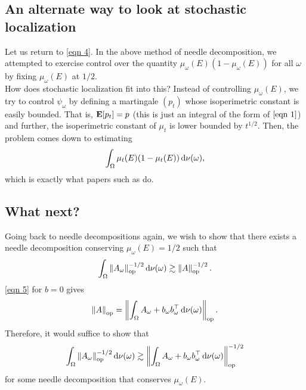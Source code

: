 \documentclass{article}
\begin{document}
	\subsection{An alternate way to look at stochastic localization}

		Let us return to \eqref{eqn 4}. In the above method of needle decomposition, we attempted to exercise control over the quantity $\mu_\omega(E) ( 1 - \mu_\omega(E) )$ for all $\omega$ by fixing $\mu_\omega(E)$ at $1/2$.\\

		How does stochastic localization fit into this? Instead of controlling $\mu_\omega(E)$, we try to control $\psi_\omega$ by defining a martingale $(p_t)$ whose isoperimetric constant is easily bounded. That is, $\textbf{E}[p_t] = p$ (this is just an integral of the form of $\eqref{eqn 1}$) and further, the isoperimetric constant of $\mu_t$ is lower bounded by $t^{1/2}$. Then, the problem comes down to estimating
		\[ \int_\Omega \mu_t(E) ( 1 - \mu_t(E) ) \operatorname{d}\!{\nu(\omega)}, \]
		which is exactly what papers such as \cite{chen2021constant} do.

	\subsection{What next?}

		Going back to needle decompositions again, we wish to show that there exists a needle decomposition conserving $\mu_\omega(E) = 1/2$ such that
		\[ \int_{\Omega} \left\lVert A_\omega\right\rVert_{\text{op}}^{-1/2} \operatorname{d}\!{\nu(\omega)} \gtrsim \left\lVert A\right\rVert_{\text{op}}^{-1/2}. \]
		\eqref{eqn 5} for $b = 0$ gives
		\[ \left\lVert A\right\rVert_{\text{op}} = \left\lVert\int_{\Omega} A_\omega + b_\omega b_\omega^\top \operatorname{d}\!{\nu(\omega)} \right\rVert_{\text{op}}. \]
		Therefore, it would suffice to show that
		\[ \int_\Omega \left\lVert A_\omega\right\rVert_{\text{op}}^{-1/2} \operatorname{d}\!{\nu(\omega)} \gtrsim \left\lVert\int_{\Omega} A_\omega + b_\omega b_\omega^\top \operatorname{d}\!{\nu(\omega)} \right\rVert_{\text{op}}^{-1/2} \]
		for some needle decomposition that conserves $\mu_\omega(E)$.\\
\end{document}
